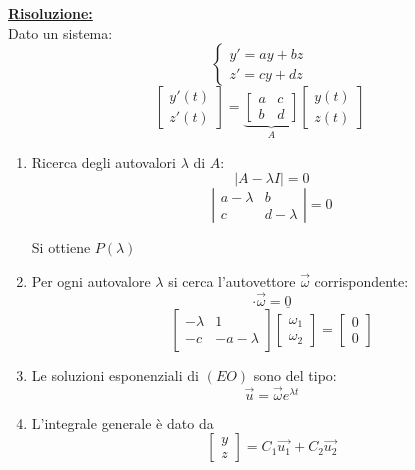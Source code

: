\underline{\textbf{Risoluzione:}}\\
Dato un sistema:
\[
    \begin{cases}
        y' = ay + bz \\
        z' = cy + dz
    \end{cases}
\]
\[
    \left[  
        \begin{matrix}
            y'(t) \\ z'(t)
        \end{matrix} 
    \right] = \underbrace{\left[
        \begin{matrix}
            a & c \\ b & d
        \end{matrix}
    \right]}_{A} \left[
        \begin{matrix}
            y(t) \\ z(t)
        \end{matrix}
    \right]
\]
\begin{enumerate}
    \item Ricerca degli autovalori $\lambda$ di $A$:
    \begin{equation}
        |A -\lambda I|=0
    \end{equation}
    \[
        \left| \begin{matrix}
            a-\lambda & b \\
            c & d-\lambda 
        \end{matrix} \right| = 0
    \]

    Si ottiene $P(\lambda)$

    \item Per ogni autovalore $\lambda$ si cerca l'autovettore $\vec{\omega}$ corrispondente:
    \begin{equation}
        [A - \lambda I] \cdot \vec{\omega} = \underline{0}
    \end{equation}
    \[
        \left[ \begin{matrix}
            -\lambda & 1 \\
            -c & -a-\lambda 
        \end{matrix} \right] \left[ \begin{matrix}
            \omega_1 \\ \omega_2 
        \end{matrix} \right] = \left[ \begin{matrix}
            0 \\ 0
        \end{matrix}\right]
    \]
    \item Le soluzioni esponenziali di $(EO)$ sono del tipo:
    \begin{equation}
        \vec{u} = \vec{\omega}  e^{\lambda t}
    \end{equation}
    \item L'integrale generale è dato da
    \begin{equation}
        \left[
            \begin{matrix}
                y \\ z
            \end{matrix}
        \right] = C_1 \vec{u_1} + C_2 \vec{u_2}
    \end{equation}
\end{enumerate}

